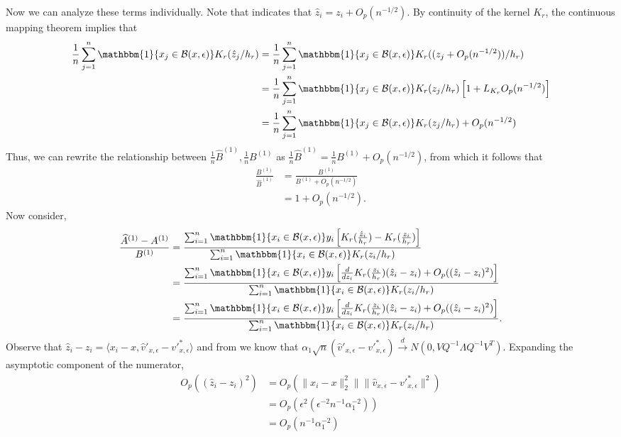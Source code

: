 \documentclass[11pt]{article}
\begin{document}
Now we can analyze these terms individually. Note that  indicates that $\hat{z}_i =  z_i + O_p(n^{-1/2})$. By continuity of the kernel $K_r$, the continuous mapping theorem implies that 
\begin{align}
    \frac{1}{n}\sum_{j = 1}^{n}\mathbbm{1}\{x_j \in \mathcal{B}(x, \epsilon)\}K_r(\hat{z}_j/h_r) &= \frac{1}{n}\sum_{j = 1}^n \mathbbm{1}\{x_j \in \mathcal{B}(x, \epsilon)\}K_r((z_j + O_p(n^{-1/2}))/h_r) \\
    &= \frac{1}{n}\sum_{j = 1}^n \mathbbm{1}\{x_j \in \mathcal{B}(x, \epsilon)\}K_r(z_j/h_r)\left[1 + L_{K_r}O_p(n^{-1/2})\right] \\
    &= \frac{1}{n}\sum_{j = 1}^n \mathbbm{1}\{x_j \in \mathcal{B}(x, \epsilon)\}K_r(z_j/h_r) + O_p(n^{-1/2})
\end{align} 
Thus, we can rewrite the relationship between $\frac{1}{n}\widehat{B}^{(1)}, \frac{1}{n}B^{(1)}$ as $\frac{1}{n}\widehat{B}^{(1)} = \frac{1}{n}B^{(1)} + O_p(n^{-1/2})$, from which it follows that
\begin{align*}
    \frac{B^{(1)}}{\widehat{B}^{(1)}} &= \frac{B^{(1)}}{B^{(1)} + O_p(n^{-1/2})} \\
    &= 1  + O_p(n^{-1/2}).
\end{align*}
Now consider,
\begin{align}
    \frac{\widehat{A}^{(1)} - A^{(1)}}{B^{(1)}} &= \frac{\sum_{i=1}^n\mathbbm{1}\{x_i \in \mathcal{B}(x, \epsilon)\}y_i\left[K_r(\frac{\hat{z}_i}{h_r}) - K_r(\frac{z_i}{h_r})\right]}{\sum_{i = 1}^n\mathbbm{1}\{x_i \in \mathcal{B}(x, \epsilon)\}K_r(z_i/h_r)} \\
    &= \frac{\sum_{i=1}^n\mathbbm{1}\{x_i \in \mathcal{B}(x, \epsilon)\}y_i\left[\frac{d}{dz_i}K_r(\frac{z_i}{h_r})(\hat{z}_i - z_i) + O_p((\hat{z}_i - z_i)^2)\right]}{\sum_{i = 1}^n\mathbbm{1}\{x_i \in \mathcal{B}(x, \epsilon)\}K_r(z_i/h_r)} \\
    &= \frac{\sum_{i=1}^n\mathbbm{1}\{x_i \in \mathcal{B}(x, \epsilon)\}y_i\left[\frac{d}{dz_i}K_r(\frac{z_i}{h_r})(\hat{z}_i - z_i) + O_p((\hat{z}_i - z_i)^2)\right]}{\sum_{i = 1}^n\mathbbm{1}\{x_i \in \mathcal{B}(x, \epsilon)\}K_r(z_i/h_r)}.
\end{align}
Observe that $\hat{z}_i - z_i = \langle x_i - x, \hat{v}'_{x, \epsilon} - v'^*_{x, \epsilon}\rangle$ and from  we know that $\alpha_1\sqrt{n}(\hat{v}'_{x, \epsilon} - v'^*_{x, \epsilon}) \overset{d}{\rightarrow} N(0, VQ^{-1}\Lambda Q^{-1}V^T)$. Expanding the asymptotic component of the numerator,
\begin{align*}
    O_p((\hat{z}_i - z_i)^2) &= O_p(\|x_i-x\|_2^2\|\|\hat{v}_{x, \epsilon} - v'^*_{x, \epsilon}\|^2) \\
    &= O_p(\epsilon^2(\epsilon^{-2}n^{-1}\alpha_1^{-2})) \\
    &= O_p(n^{-1}\alpha_1^{-2})
\end{align*}
\end{document}
